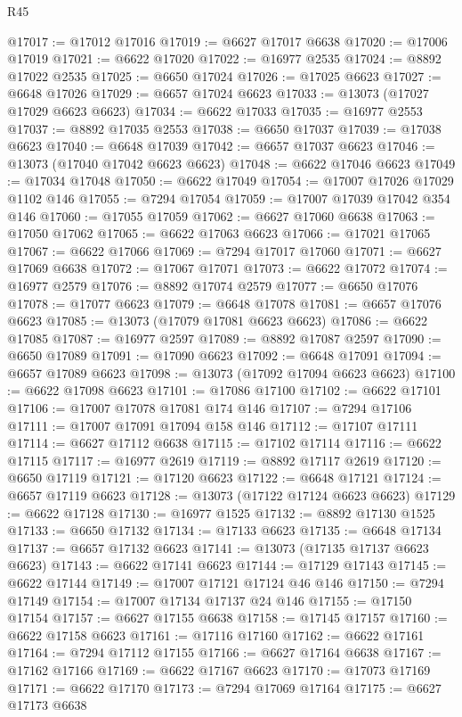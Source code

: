 \begin{lexlean}{R45}
\begin{coremodule}
{@17017 := @17012 @17016
@17019 := @6627 @17017 @6638
@17020 := @17006 @17019
@17021 := @6622 @17020
@17022 := @16977 @2535
@17024 := @8892 @17022 @2535
@17025 := @6650 @17024
@17026 := @17025 @6623
@17027 := @6648 @17026
@17029 := @6657 @17024 @6623
@17033 := @13073 (@17027 @17029 @6623 @6623)
@17034 := @6622 @17033
@17035 := @16977 @2553
@17037 := @8892 @17035 @2553
@17038 := @6650 @17037
@17039 := @17038 @6623
@17040 := @6648 @17039
@17042 := @6657 @17037 @6623
@17046 := @13073 (@17040 @17042 @6623 @6623)
@17048 := @6622 @17046 @6623
@17049 := @17034 @17048
@17050 := @6622 @17049
@17054 := @17007 @17026 @17029 @1102 @146
@17055 := @7294 @17054
@17059 := @17007 @17039 @17042 @354 @146
@17060 := @17055 @17059
@17062 := @6627 @17060 @6638
@17063 := @17050 @17062
@17065 := @6622 @17063 @6623
@17066 := @17021 @17065
@17067 := @6622 @17066
@17069 := @7294 @17017 @17060
@17071 := @6627 @17069 @6638
@17072 := @17067 @17071
@17073 := @6622 @17072
@17074 := @16977 @2579
@17076 := @8892 @17074 @2579
@17077 := @6650 @17076
@17078 := @17077 @6623
@17079 := @6648 @17078
@17081 := @6657 @17076 @6623
@17085 := @13073 (@17079 @17081 @6623 @6623)
@17086 := @6622 @17085
@17087 := @16977 @2597
@17089 := @8892 @17087 @2597
@17090 := @6650 @17089
@17091 := @17090 @6623
@17092 := @6648 @17091
@17094 := @6657 @17089 @6623
@17098 := @13073 (@17092 @17094 @6623 @6623)
@17100 := @6622 @17098 @6623
@17101 := @17086 @17100
@17102 := @6622 @17101
@17106 := @17007 @17078 @17081 @174 @146
@17107 := @7294 @17106
@17111 := @17007 @17091 @17094 @158 @146
@17112 := @17107 @17111
@17114 := @6627 @17112 @6638
@17115 := @17102 @17114
@17116 := @6622 @17115
@17117 := @16977 @2619
@17119 := @8892 @17117 @2619
@17120 := @6650 @17119
@17121 := @17120 @6623
@17122 := @6648 @17121
@17124 := @6657 @17119 @6623
@17128 := @13073 (@17122 @17124 @6623 @6623)
@17129 := @6622 @17128
@17130 := @16977 @1525
@17132 := @8892 @17130 @1525
@17133 := @6650 @17132
@17134 := @17133 @6623
@17135 := @6648 @17134
@17137 := @6657 @17132 @6623
@17141 := @13073 (@17135 @17137 @6623 @6623)
@17143 := @6622 @17141 @6623
@17144 := @17129 @17143
@17145 := @6622 @17144
@17149 := @17007 @17121 @17124 @46 @146
@17150 := @7294 @17149
@17154 := @17007 @17134 @17137 @24 @146
@17155 := @17150 @17154
@17157 := @6627 @17155 @6638
@17158 := @17145 @17157
@17160 := @6622 @17158 @6623
@17161 := @17116 @17160
@17162 := @6622 @17161
@17164 := @7294 @17112 @17155
@17166 := @6627 @17164 @6638
@17167 := @17162 @17166
@17169 := @6622 @17167 @6623
@17170 := @17073 @17169
@17171 := @6622 @17170
@17173 := @7294 @17069 @17164
@17175 := @6627 @17173 @6638
}
\end{coremodule}
\end{lexlean}

